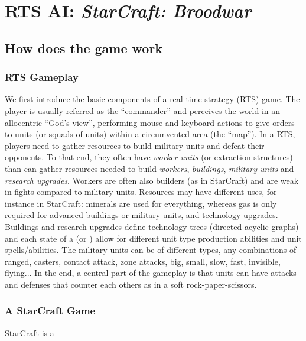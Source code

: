 \chapter{RTS AI: \textit{StarCraft: Broodwar}}

\section{How does the game work}

\subsection{RTS Gameplay}
We first introduce the basic components of a real-time strategy (RTS) game. The player is usually referred as the ``commander'' and perceives the world in an allocentric ``God's view'', performing mouse and keyboard actions to give orders to units (or squads of units) within a circumvented area (the ``map''). In a RTS, players need to gather resources to build military units and defeat their opponents. To that end, they often have \textit{worker units} (or extraction structures) than can gather resources needed to build \textit{workers}, \textit{buildings}, \textit{military units} and \textit{research upgrades}. Workers are often also builders (as in StarCraft) and are weak in fights compared to military units. Resources may have different uses, for instance in StarCraft: minerals are used for everything, whereas gas is only required for advanced buildings or military units, and technology upgrades. Buildings and research upgrades define technology trees (directed acyclic graphs) and each state of a  (or ) allow for different unit type production abilities and unit spells/abilities. The military units can be of different types, any combinations of ranged, casters, contact attack, zone attacks, big, small, slow, fast, invisible, flying... In the end, a central part of the gameplay is that units can have attacks and defenses that counter each others as in a soft rock-paper-scissors. 



\subsection{A StarCraft Game}
StarCraft is a 


